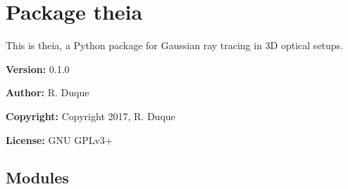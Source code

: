 %
%
%


\section{Package theia}

    \label{theia}
This is theia, a Python package for Gaussian ray tracing in 3D optical 
setups.

\textbf{Version:} 0.1.0



\textbf{Author:} R. Duque



\textbf{Copyright:} Copyright 2017, R. Duque



\textbf{License:} GNU GPLv3+





\subsection{Modules}

